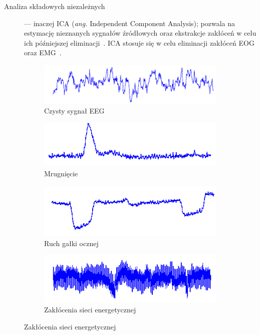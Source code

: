 \documentclass[skorowidz,skroty]{dyplomWEZUT}
\begin{document}
\begin{description}
    \item [Analiza składowych niezależnych] --- inaczej ICA (\textit{ang.} Independent Component Analysis); pozwala na estymację nieznanych sygnałów źródłowych oraz ekstrakcje zakłóceń w celu ich późniejszej eliminacji~\cite{eeg_noise}. ICA stosuje się w celu eliminacji zakłóceń EOG oraz EMG~\cite{bci_introduction}.
\end{description}

\begin{figure}[htb]
    \begin{subfigure}{0.48\textwidth}
    \includegraphics[width=\linewidth]{graphic/eeg_noise_clean}
    \caption{Czysty sygnał EEG}
    \end{subfigure}\hspace*{\fill}
    \begin{subfigure}{0.48\textwidth}
    \includegraphics[width=\linewidth]{graphic/eeg_noise_blink}
    \caption{Mrugnięcie}
    \end{subfigure}
    
    \medskip
    \begin{subfigure}{0.48\textwidth}
    \includegraphics[width=\linewidth]{graphic/eeg_noise_eye}
    \caption{Ruch gałki ocznej}
    \end{subfigure}\hspace*{\fill}
    \begin{subfigure}{0.48\textwidth}
    \includegraphics[width=\linewidth]{graphic/eeg_noise_line}
    \caption{Zakłócenia sieci energetycznej}
    \end{subfigure}
    

\end{figure}
\end{document}
